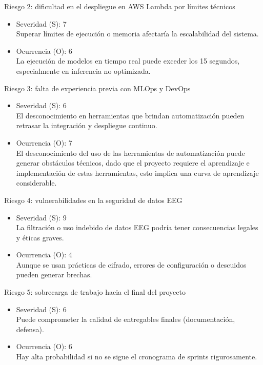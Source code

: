 \documentclass[
11pt, %
]{charter}
\begin{document}
Riesgo 2: dificultad en el despliegue en AWS Lambda por límites técnicos
\begin{itemize}
    \item Severidad (S): 7 \\
    Superar límites de ejecución o memoria afectaría la escalabilidad del sistema.
    \item Ocurrencia (O): 6 \\
    La ejecución de modelos en tiempo real puede exceder los 15 segundos, especialmente en inferencia no optimizada.
\end{itemize}

Riesgo 3: falta de experiencia previa con MLOps y DevOps
\begin{itemize}
    \item Severidad (S): 6 \\
    El desconocimiento en herramientas que brindan automatización pueden retrasar la integración y despliegue continuo.
    
    \item Ocurrencia (O): 7 \\
    El desconocimiento del uso de las herramientas de automatización puede generar obstáculos técnicos, dado que el proyecto requiere el aprendizaje e implementación de estas herramientas, esto implica una curva de aprendizaje considerable.
\end{itemize}

Riesgo 4: vulnerabilidades en la seguridad de datos EEG
\begin{itemize}
    \item Severidad (S): 9 \\
    La filtración o uso indebido de datos EEG podría tener consecuencias legales y éticas graves.
    \item Ocurrencia (O): 4 \\
    Aunque se usan prácticas de cifrado, errores de configuración o descuidos pueden generar brechas.
\end{itemize}

Riesgo 5: sobrecarga de trabajo hacia el final del proyecto
\begin{itemize}
    \item Severidad (S): 6 \\
    Puede comprometer la calidad de entregables finales (documentación, defensa).
    \item Ocurrencia (O): 6 \\
    Hay alta probabilidad si no se sigue el cronograma de sprints rigurosamente.
\end{itemize}
\end{document}
